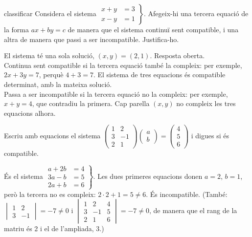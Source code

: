 \begin{apartats}
\begin{tria}{classificar}
Considera el sistema $\left.\begin{aligned}x+y&=3\\x-y&=1\end{aligned}\right\}$. Afegeix-hi una
tercera equació de la forma $ax+by=c$ de manera que el sistema continuï sent compatible, i una altra
de manera que passi a ser incompatible. Justifica-ho.

\begin{solucio}
El sistema té una sola solució, $(x,y)=(2,1)$. Resposta oberta.\\
Continua sent compatible si la tercera equació també la compleix: per exemple, $2x+3y=7$, perquè
$4+3=7$. El sistema de tres equacions és compatible determinat, amb la mateixa solució.\\
Passa a ser incompatible si la tercera equació no la compleix: per exemple, $x+y=4$, que contradiu la
primera. Cap parella $(x,y)$ no compleix les tres equacions alhora.
\end{solucio}
\end{tria}

\begin{nomesllarg}
Escriu amb equacions el sistema
$\begin{pmatrix}1&2\\3&-1\\2&1\end{pmatrix}\begin{pmatrix}a\\b\end{pmatrix}=\begin{pmatrix}4\\5\\6\end{pmatrix}$
i digues si és compatible.

\begin{solucio}
És el sistema $\left.\begin{aligned}a+2b&=4\\3a-b&=5\\2a+b&=6\end{aligned}\right\}$. Les dues primeres
equacions donen $a=2$, $b=1$, però la tercera no es compleix: $2\cdot2+1=5\ne6$. És incompatible.
(També: $\begin{vmatrix}1&2\\3&-1\end{vmatrix}=-7\ne0$ i $\begin{vmatrix}1&2&4\\3&-1&5\\2&1&6\end{vmatrix}=-7\ne0$,
de manera que el rang de la matriu és 2 i el de l'ampliada, 3.)
\end{solucio}
\end{nomesllarg}

\end{apartats}
